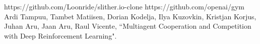 \documentclass{article}
\begin{document}
\begin{thebibliography}{00}
https://github.com/Loonride/slither.io-clone
https://github.com/openai/gym
Ardi Tampuu, Tambet Matiisen, Dorian Kodelja, Ilya Kuzovkin, Kristjan Korjus, Juhan Aru, Jaan Aru, Raul Vicente, ``Multiagent Cooperation and Competition with Deep Reinforcement Learning".
\end{thebibliography}
\end{document}

